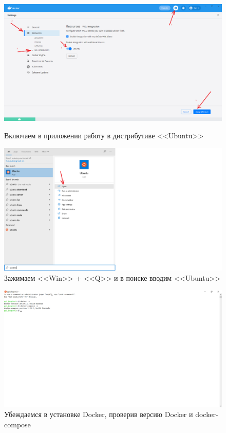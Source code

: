 \begin{figure}[!p]
    \centering
    \begin{minipage}{0.47\textwidth}
        \centering
        \includegraphics[width=\linewidth]
            {_assets/gpi_pz_docker_20.png}
        \caption{Включаем в приложении работу в дистрибутиве <<Ubuntu>>}
        \label{fig:gpi_pz_docker_20}
    \end{minipage}
    \begin{minipage}{0.47\textwidth}
        \centering
        \includegraphics[width=\linewidth]
            {_assets/gpi_pz_docker_21.png}
        \caption{Зажимаем <<Win>> + <<Q>> и в поиске вводим <<Ubuntu>>}
        \label{fig:gpi_pz_docker_21}
    \end{minipage}
\end{figure}

\begin{figure}[!p]
    \centering
    \includegraphics[width=12cm]
        {_assets/gpi_pz_docker_22.png}
    \caption{Убеждаемся в установке Docker, проверив версию Docker и docker-compose}
    \label{fig:gpi_pz_docker_22}
\end{figure}

